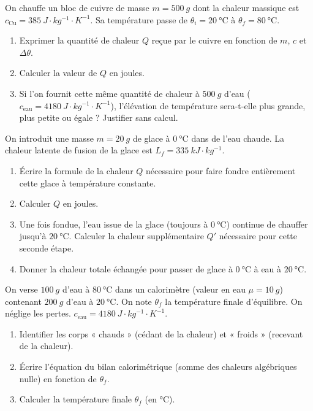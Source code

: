 \documentclass[11pt]{article}
\begin{document}
\begin{exercice}
On chauffe un bloc de cuivre de masse $m = \SI{500}{g}$ dont la chaleur massique est $c_{\text{Cu}} = \SI{385}{J\cdot kg^{-1}\cdot K^{-1}}$. Sa température passe de $\theta_i = \SI{20}{\celsius}$ à $\theta_f = \SI{80}{\celsius}$.
\begin{enumerate}
    \item Exprimer la quantité de chaleur $Q$ reçue par le cuivre en fonction de $m$, $c$ et $\Delta\theta$.
    \item Calculer la valeur de $Q$ en joules.
    \item Si l'on fournit cette même quantité de chaleur à $\SI{500}{g}$ d'eau ($c_{\text{eau}} = \SI{4180}{J\cdot kg^{-1}\cdot K^{-1}}$), l'élévation de température sera-t-elle plus grande, plus petite ou égale ? Justifier sans calcul.
\end{enumerate}
\end{exercice}

\begin{exercice}
On introduit une masse $m = \SI{20}{g}$ de glace à $\SI{0}{\celsius}$ dans de l'eau chaude. La chaleur latente de fusion de la glace est $L_f = \SI{335}{kJ\cdot kg^{-1}}$.
\begin{enumerate}
    \item Écrire la formule de la chaleur $Q$ nécessaire pour faire fondre entièrement cette glace à température constante.
    \item Calculer $Q$ en joules.
    \item Une fois fondue, l'eau issue de la glace (toujours à $\SI{0}{\celsius}$) continue de chauffer jusqu'à $\SI{20}{\celsius}$. Calculer la chaleur supplémentaire $Q'$ nécessaire pour cette seconde étape.
    \item Donner la chaleur totale échangée pour passer de glace à $\SI{0}{\celsius}$ à eau à $\SI{20}{\celsius}$.
\end{enumerate}
\end{exercice}

\begin{exercice}
On verse $\SI{100}{g}$ d'eau à $\SI{80}{\celsius}$ dans un calorimètre (valeur en eau $\mu = \SI{10}{g}$) contenant $\SI{200}{g}$ d'eau à $\SI{20}{\celsius}$.
On note $\theta_f$ la température finale d'équilibre. On néglige les pertes. $c_{\text{eau}} = \SI{4180}{J\cdot kg^{-1}\cdot K^{-1}}$.
\begin{enumerate}
    \item Identifier les corps « chauds » (cédant de la chaleur) et « froids » (recevant de la chaleur).
    \item Écrire l'équation du bilan calorimétrique (somme des chaleurs algébriques nulle) en fonction de $\theta_f$.
    \item Calculer la température finale $\theta_f$ (en \si{\celsius}).
\end{enumerate}
\end{exercice}
\end{document}
